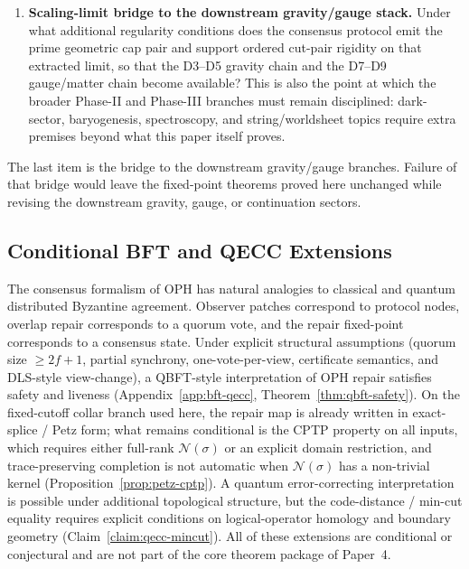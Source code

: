 \documentclass[11pt]{article}
\theoremstyle{remark}
\theoremstyle{plain}
\begin{document}
\begin{enumerate}
\item \textbf{Scaling-limit bridge to the downstream gravity/gauge stack.} Under what additional regularity conditions does the consensus protocol emit the prime geometric cap pair and support ordered cut-pair rigidity on that extracted limit, so that the D3--D5 gravity chain and the D7--D9 gauge/matter chain become available? This is also the point at which the broader Phase-II and Phase-III branches must remain disciplined: dark-sector, baryogenesis, spectroscopy, and string/worldsheet topics require extra premises beyond what this paper itself proves.
\end{enumerate}

The last item is the bridge to the downstream gravity/gauge branches. Failure of that bridge would
leave the fixed-point theorems proved here unchanged while revising the downstream gravity, gauge,
or continuation sectors.

\subsection{Conditional BFT and QECC Extensions}
\label{subsec:conditional-bft-qecc}

The consensus formalism of \textrm{OPH} has natural analogies to classical and quantum
distributed Byzantine agreement. Observer patches correspond to protocol nodes, overlap repair
corresponds to a quorum vote, and the repair fixed-point corresponds to a consensus state. Under
explicit structural assumptions (quorum size $\geq 2f+1$, partial synchrony, one-vote-per-view,
certificate semantics, and \textrm{DLS}-style view-change), a \textrm{QBFT}-style interpretation
of \textrm{OPH} repair satisfies safety and liveness (Appendix~\ref{app:bft-qecc},
Theorem~\ref{thm:qbft-safety}). On the fixed-cutoff collar branch used here, the repair map is
already written in exact-splice / Petz form; what remains conditional is the \textrm{CPTP}
property on all inputs, which requires either full-rank $\mathcal{N}(\sigma)$ or an explicit
domain restriction, and trace-preserving completion is not automatic when
$\mathcal{N}(\sigma)$ has a non-trivial kernel
(Proposition~\ref{prop:petz-cptp}). A quantum error-correcting interpretation is possible under
additional topological structure, but the code-distance / min-cut equality requires explicit
conditions on logical-operator homology and boundary geometry (Claim~\ref{claim:qecc-mincut}). All
of these extensions are conditional or conjectural and are not part of the core theorem package of
Paper~4.
\end{document}
